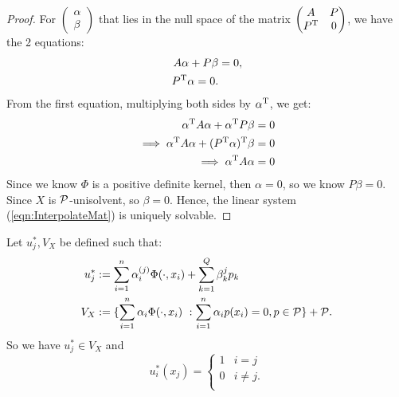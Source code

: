 \documentclass[twoside]{memoir}
\begin{document}
	\begin{proof}
		For $\begin{pmatrix}
		\alpha \\ \beta
		\end{pmatrix}$ that lies in the null space of the matrix
		$\begin{pmatrix}
		A & P \\
		P^{\text{T}} & 0 \\
		\end{pmatrix}$, we have the 2 equations:
		\begin{equation*}
		\begin{split}
		A \alpha + P \beta &= 0,\\
		P^{\text{T}} \alpha = 0. \\
		\end{split}
		\end{equation*}
		From the first equation, multiplying both sides by $\alpha^{\text{T}}$, we get:
		\begin{equation*}
		\begin{split}
		\alpha^{\text{T}} A \alpha + \alpha^{\text{T}} P \beta &= 0\\
		\implies \alpha^{\text{T}} A \alpha + (P^{\text{T}} \alpha)^{\text{T}} \beta &= 0\\
		\implies \alpha^{\text{T}} A \alpha &= 0\\
		\end{split}
		\end{equation*}
		Since we know $\Phi$ is a positive definite kernel, then $\alpha = 0$, so we know $P \beta = 0$. Since $X$ is $\mathcal{P}$-unisolvent, so $\beta = 0$. Hence, the linear system (\ref{eqn:InterpolateMat}) is uniquely solvable.
	\end{proof}
	Let $u_j^*, V_X$ be defined such that:
	\begin{equation}
	\begin{split}
	u_j^* &:= \sum_{i=1}^{n} \alpha_i^{(j)} \Phi(\cdot, x_i) + \sum_{k=1}^{Q} \beta_k^{j} p_k \label{eq:ustar}\\
	V_X &:= \{ \sum_{i=1}^{n} \alpha_i \Phi(\cdot, x_i) ~ : \sum_{i=1}^{n} \alpha_i p(x_i) = 0, p \in \mathcal{P}  \} + \mathcal{P}.
	\end{split}
	\end{equation}
	So we have $u_j^* \in V_X$ and \[ u_i^*(x_j) =  \begin{cases} 
	1 & i=j \\
	0 & i \neq j.\\
	\end{cases}
	\]
	
\end{document}
